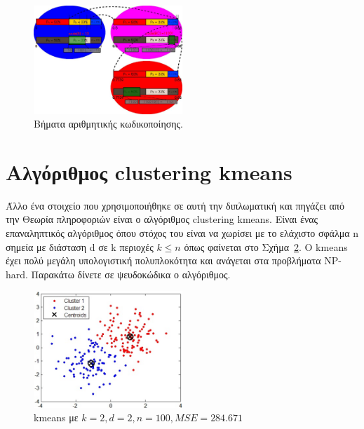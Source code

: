 \begin{itemize}
      \begin{figure}[ht!]
          \centering
          \includegraphics[width=0.5\textwidth]{chapter3/ac.jpg}
          \caption{Βήματα αριθμητικής κωδικοποίησης.}
          \label{fig:ac}
      \end{figure}
\end{itemize}

\newpage
\section{Αλγόριθμος clustering kmeans}
\label{section:sect34}

\indent Άλλο ένα στοιχείο που χρησιμοποιήθηκε σε αυτή την διπλωματική και πηγάζει από την Θεωρία πληροφοριών είναι ο αλγόριθμος clustering kmeans. Είναι ένας επαναληπτικός αλγόριθμος όπου στόχος του είναι να χωρίσει με το ελάχιστο σφάλμα n σημεία με διάσταση d σε k περιοχές $ k \leq n $ όπως φαίνεται στο Σχήμα~\ref{fig:kmeans}. O kmeans έχει πολύ μεγάλη υπολογιστική πολυπλοκότητα και ανάγεται στα προβλήματα NP-hard. Παρακάτω δίνετε σε ψευδοκώδικα ο αλγόριθμος.\\

\begin{algorithmic}[1]
    \ENDFOR
    \ENDFOR
\ENDWHILE
\end{algorithmic}

\begin{figure}[ht!]
  \centering
  \includegraphics[width=0.5\textwidth]{chapter3/kmeans.jpg}
  \caption{kmeans με $k=2,d=2,n=100,MSE=284.671$}
  \label{fig:kmeans}
\end{figure}

